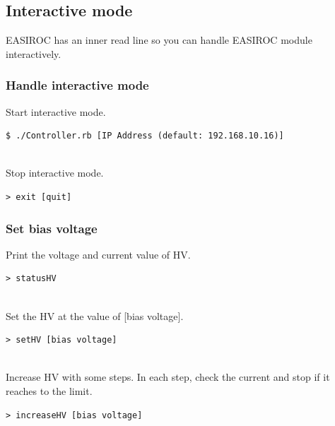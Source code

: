 \newpage
\subsection{Interactive mode}
EASIROC has an inner read line so you can handle EASIROC module interactively.

\subsubsection{Handle interactive mode}
Start interactive mode.
\begin{shadebox}
\begin{verbatim}
$ ./Controller.rb [IP Address (default: 192.168.10.16)]
\end{verbatim}
\end{shadebox}
　\\
Stop interactive mode.
\begin{shadebox}
\begin{verbatim}
> exit [quit]
\end{verbatim}
\end{shadebox}


\subsubsection{Set bias voltage}

Print the voltage and current value of HV.
\begin{shadebox}
\begin{verbatim}
> statusHV
\end{verbatim}
\end{shadebox}
　\\
Set the HV at the value of [bias voltage].
\begin{shadebox}
\begin{verbatim}
> setHV [bias voltage]
\end{verbatim}
\end{shadebox}
　\\
Increase HV with some steps. In each step, check the current and stop if it reaches to the limit.
\begin{shadebox}
\begin{verbatim}
> increaseHV [bias voltage]
\end{verbatim}
\end{shadebox}

